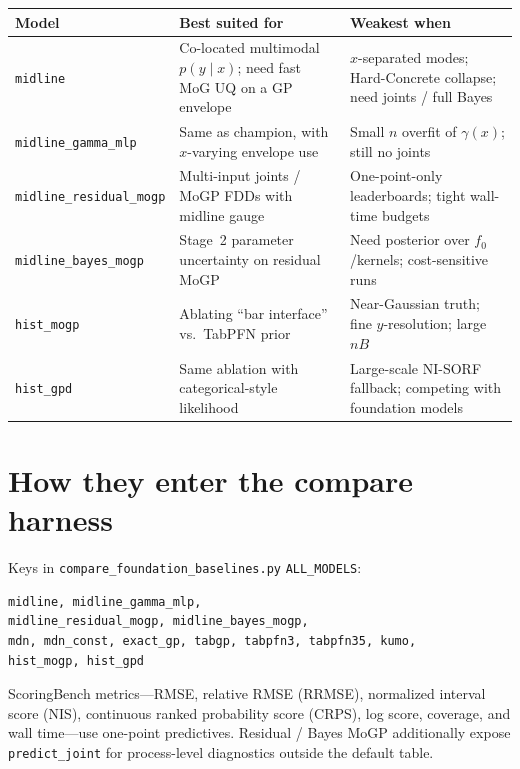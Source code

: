 \documentclass[11pt,a4paper]{article}
\theoremstyle{definition}
\begin{document}
\begin{center}
\renewcommand{\arraystretch}{1.12}
\small
\begin{tabular}{@{}p{2.6cm}p{5.0cm}p{5.0cm}@{}}
\toprule
Model & Best suited for & Weakest when \\
\midrule
\texttt{midline} &
  Co-located multimodal $p(y\mid x)$; need fast MoG UQ on a GP envelope &
  $x$-separated modes; Hard-Concrete collapse; need joints / full Bayes \\
\texttt{midline\_gamma\_mlp} &
  Same as champion, with $x$-varying envelope use &
  Small $n$ overfit of $\gamma(x)$; still no joints \\
\texttt{midline\_residual\_mogp} &
  Multi-input joints / MoGP FDDs with midline gauge &
  One-point-only leaderboards; tight wall-time budgets \\
\texttt{midline\_bayes\_mogp} &
  Stage~2 parameter uncertainty on residual MoGP &
  Need posterior over $f_0$/kernels; cost-sensitive runs \\
\texttt{hist\_mogp} &
  Ablating ``bar interface'' vs.\ TabPFN prior &
  Near-Gaussian truth; fine $y$-resolution; large $nB$ \\
\texttt{hist\_gpd} &
  Same ablation with categorical-style likelihood &
  Large-scale NI-SORF fallback; competing with foundation models \\
\bottomrule
\end{tabular}
\end{center}

\section{How they enter the compare harness}

Keys in \texttt{compare\_foundation\_baselines.py} \texttt{ALL\_MODELS}:
\begin{verbatim}
midline, midline_gamma_mlp,
midline_residual_mogp, midline_bayes_mogp,
mdn, mdn_const, exact_gp, tabgp, tabpfn3, tabpfn35, kumo,
hist_mogp, hist_gpd
\end{verbatim}
ScoringBench metrics---RMSE, relative RMSE (RRMSE), normalized interval score
(NIS), continuous ranked probability score (CRPS), log score, coverage, and wall
time---use one-point predictives. Residual / Bayes MoGP additionally expose
\texttt{predict\_joint} for process-level diagnostics outside the default table.
\end{document}

